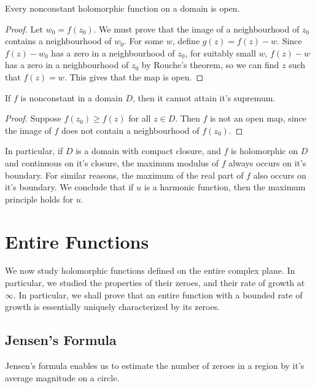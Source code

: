 \begin{theorem}
    Every nonconstant holomorphic function on a domain is open.
\end{theorem}
\begin{proof}
    Let $w_0 = f(z_0)$. We must prove that the image of a neighbourhood of $z_0$ contains a neighbourhood of $w_0$. For some $w$, define $g(z) = f(z) - w$. Since $f(z) - w_0$ has a zero in a neighbourhood of $z_0$, for suitably small $w$, $f(z) - w$ has a zero in a neighbourhood of $z_0$ by Rouche's theorem, so we can find $z$ such that $f(z) = w$. This gives that the map is open.
\end{proof}

\begin{corollary}
    If $f$ is nonconstant in a domain $D$, then it cannot attain it's supremum.
\end{corollary}
\begin{proof}
    Suppose $f(z_0) \geq f(z)$ for all $z \in D$. Then $f$ is not an open map, since the image of $f$ does not contain a neighbourhood of $f(z_0)$.
\end{proof}

In particular, if $D$ is a domain with compact closure, and $f$ is holomorphic on $D$ and continuous on it's closure, the maximum modulus of $f$ always occurs on it's boundary. For similar reasons, the maximum of the real part of $f$ also occurs on it's boundary. We conclude that if $u$ is a harmonic function, then the maximum principle holds for $u$.

\chapter{Entire Functions}

We now study holomorphic functions defined on the entire complex plane. In particular, we studied the properties of their zeroes, and their rate of growth at $\infty$. In particular, we shall prove that an entire function with a bounded rate of growth is essentially uniquely characterized by its zeroes.

\section{Jensen's Formula}

Jensen's formula enables us to estimate the number of zeroes in a region by it's average magnitude on a circle.

